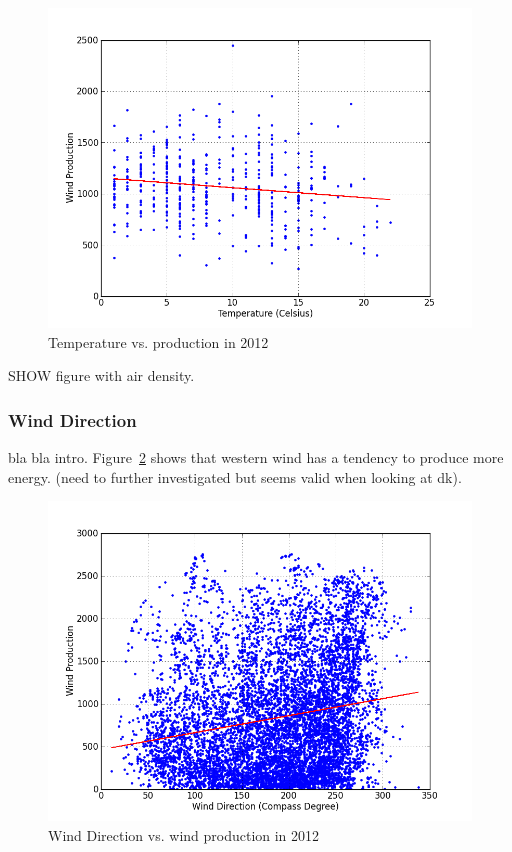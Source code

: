 \begin{figure}[h!]
\centering
\includegraphics[width=0.99\linewidth,natwidth=898,natheight=587]{billeder/windProductionForTemperature13.png}
\caption{Temperature vs. production in 2012}
\label{fig:tempVsProd}
\end{figure}

SHOW figure with air density.

\subsubsection{Wind Direction}
bla bla intro. Figure~\ref{fig:windDirVsProd} shows that western wind has a tendency to produce more energy. (need to further investigated but seems valid when looking at dk).
\begin{figure}[h!]
\centering
\includegraphics[width=0.99\linewidth,natwidth=898,natheight=587]{billeder/productionVsWindDirection.png}
\caption{Wind Direction vs. wind production in 2012}
\label{fig:windDirVsProd}
\end{figure}

